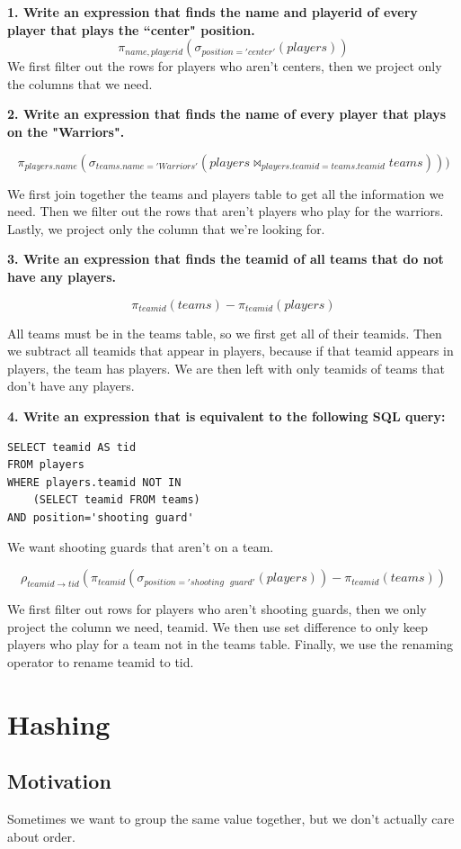 \documentclass{article}
\begin{document}
\textbf{1. Write an expression that finds the name and playerid of every player that plays the “center" position.
}
\[
\pi_{name, playerid}(\sigma_{position = 'center'}(players))
\]
We first filter out the rows for players who aren’t centers, then we project only the columns that we need.

\textbf{2. Write an expression that finds the name of every player that plays on the "Warriors".}

\[
    \pi_{players.name}(\sigma_{teams.name = 'Warriors'}(players \bowtie_{players.teamid = teams.teamid} teams)))
\]

We first join together the teams and players table to get all the information we need. Then we filter out the rows that aren't players who play for the warriors. Lastly, we project only the column that we're looking for.

\textbf{3. Write an expression that finds the teamid of all teams that do not have any players.}

\[
\pi_{teamid}(teams) - \pi_{teamid}(players)
\]

All teams must be in the teams table, so we first get all of their teamids. Then we subtract all teamids that appear in players, because if that teamid appears in players, the team has players. We are then left with only teamids of teams that don't have any players.

\textbf{4. Write an expression that is equivalent to the following SQL query:}

\begin{lstlisting}
SELECT teamid AS tid 
FROM players
WHERE players.teamid NOT IN
    (SELECT teamid FROM teams)
AND position='shooting guard'
\end{lstlisting}

We want shooting guards that aren't on a team.

\[
\rho_{teamid \rightarrow tid}(\pi_{teamid}(\sigma_{position = 'shooting \text{ } guard'}(players)) - \pi_{teamid}(teams))
\]

We first filter out rows for players who aren’t shooting guards, then we only project the column we need, teamid. We then use set difference to only keep players who play for a team not in the teams table. Finally, we use the renaming operator to rename teamid to tid.


\section{Hashing}
\subsection{Motivation}
Sometimes we want to group the same value together, but we don't actually care about order. 
\end{document}
